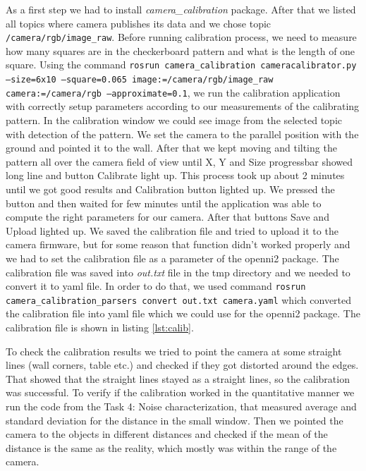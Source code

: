 \documentclass[11pt]{article}
\begin{document}
	As a first step we had to install \emph{camera\_calibration} package. After that we listed all topics where camera publishes its data and we chose topic \texttt{/camera/rgb/image\_raw}. Before running calibration process, we need to measure how many squares are in the checkerboard pattern and what is the length of one square. Using the command \texttt{rosrun camera\_calibration cameracalibrator.py --size=6x10 --square=0.065 image:=/camera/rgb/image\_raw{ }}\texttt{camera:=/camera/rgb --approximate=0.1}, we run the calibration application with correctly setup parameters according to our measurements of the calibrating pattern. In the calibration window we could see image from the selected topic with detection of the pattern. We set the camera to the parallel position with the ground and pointed it to the wall. After that we kept moving and tilting the pattern all over the camera field of view until X, Y and Size progressbar showed long line and button Calibrate light up. This process took up about 2 minutes until we got good results and Calibration button lighted up. We pressed the button and then waited for few minutes until the application was able to compute the right parameters for our camera. After that buttons Save and Upload lighted up. We saved the calibration file and tried to upload it to the camera firmware, but for some reason that function didn't worked properly and we had to set the calibration file as a parameter of the openni2 package. The calibration file was saved into \emph{out.txt} file in the tmp directory and we needed to convert it to yaml file. In order to do that, we used command \texttt{rosrun camera\_calibration\_parsers convert  out.txt camera.yaml} which converted the calibration file into yaml file which we could use for the openni2 package. The calibration file is shown in listing \vref{lst:calib}. \par
	To check the calibration results we tried to point the camera at some straight lines (wall corners, table etc.) and checked if they got distorted around the edges. That showed that the straight lines stayed as a straight lines, so the calibration was successful. To verify if the calibration worked in the quantitative manner we run the code from the Task 4: Noise characterization, that measured average and standard deviation for the distance in the small window. Then we pointed the camera to the objects in different distances and checked if the mean of the distance is the same as the reality, which mostly was within the range of the camera. \par
	
\end{document}
